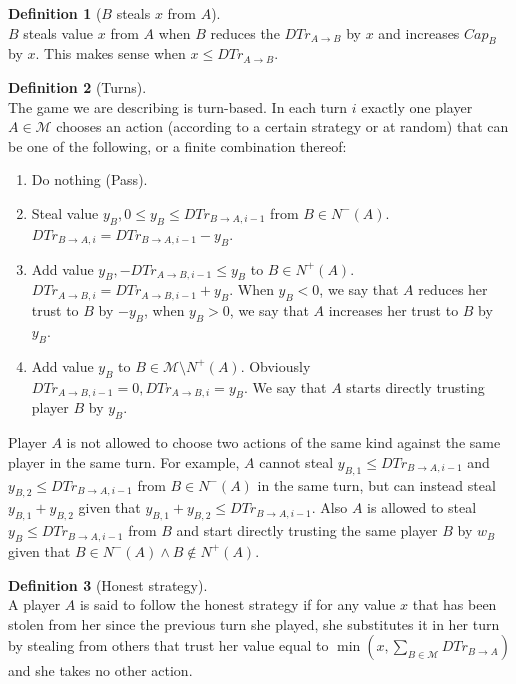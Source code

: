 \documentclass[11pt]{article}
\theoremstyle{definition}
\newtheorem{definition}{Definition}[section]
\theoremstyle{corollary}
\begin{document}
      \begin{definition}[$B$ steals $x$ from $A$] \ \\
         $B$ steals value $x$ from $A$ when $B$ reduces the $DTr_{A \rightarrow B}$ by $x$ and increases $Cap_B$ by $x$.
         This makes sense when $x \leq DTr_{A \rightarrow B}$.
      \end{definition}
      \begin{definition}[Turns] \ \\
         The game we are describing is turn-based. In each turn $i$ exactly one player $A \in \mathcal{M}$ chooses
         an action (according to a certain strategy or at random) that can be one of the following, or a finite
         combination thereof:
         \begin{enumerate}
            \item Do nothing (Pass).
            \item Steal value $y_B, 0 \leq y_B \leq DTr_{B \rightarrow A, i-1}$ from $B \in N^{-}(A)$.
            $DTr_{B \rightarrow A, i} = DTr_{B \rightarrow A, i-1} - y_B$.
            \item Add value $y_B, -DTr_{A \rightarrow B, i-1} \leq y_B$ to $B \in N^{+}(A)$.
            $DTr_{A \rightarrow B, i} = DTr_{A \rightarrow B, i-1} + y_B$. When $y_B < 0$, we say that $A$ reduces
            her trust to $B$ by $-y_B$, when $y_B > 0$, we say that $A$ increases her trust to $B$ by $y_B$.
            \item Add value $y_B$ to $B \in \mathcal{M} \setminus N^{+}(A)$.
            Obviously $DTr_{A \rightarrow B, i-1} = 0, DTr_{A \rightarrow B, i} = y_B$. We say that $A$ starts directly
            trusting player $B$ by $y_B$.
         \end{enumerate}
         Player $A$ is not allowed to choose two actions of the same kind against the same player in the same turn.
         For example, $A$ cannot steal $y_{B,1} \leq DTr_{B \rightarrow A, i-1}$ and
         $y_{B,2} \leq DTr_{B \rightarrow A, i-1}$ from $B \in N^{-}(A)$ in the same turn, but can instead steal
         $y_{B,1} + y_{B,2}$ given that $y_{B,1} + y_{B,2} \leq DTr_{B \rightarrow A, i-1}$. Also $A$ is allowed
         to steal $y_B \leq DTr_{B \rightarrow A, i-1}$ from $B$ and start directly trusting the same player $B$ by
         $w_B$ given that $B \in N^{-}(A) \wedge B \notin N^{+}(A)$.
      \end{definition}
      \begin{definition}[Honest strategy] \ \\
         A player $A$ is said to follow the honest strategy if for any value $x$ that has been stolen from her since
         the previous turn she played, she substitutes it in her turn by stealing from others that trust her value
         equal to $\min{(x,\sum\limits_{B \in \mathcal{M}}{DTr_{B \rightarrow A}})}$ and she takes no other action.
      \end{definition}
\end{document}
